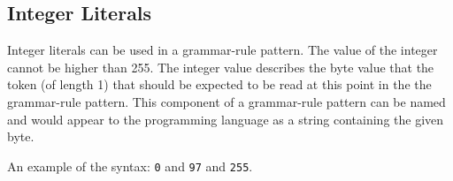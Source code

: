 
\subsection{Integer Literals}
{
	Integer literals can be used in a grammar-rule pattern.
	The value of the integer cannot be higher than 255.
	The integer value describes the byte value that the token (of length 1)
	that should be expected to be read at this point in the the grammar-rule
	pattern.
	This component of a grammar-rule pattern can be named and would appear to
	the programming language as a string containing the given byte.
	
	An example of the syntax: \texttt{0} and \texttt{97} and \texttt{255}.
}
